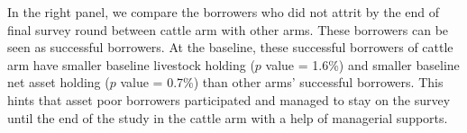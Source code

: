 	In the right panel, we compare the borrowers who did not attrit by the end of final survey round between \textsf{cattle} arm with other arms. These borrowers can be seen as successful borrowers. At the baseline, these successful borrowers of \textsf{cattle} arm have smaller baseline livestock holding ($p$ value = 1.6\%) and smaller baseline net asset holding ($p$ value = 0.7\%) than other arms' successful borrowers. %
	This hints that asset poor borrowers participated and managed to stay on the survey until the end of the study in the \textsf{cattle} arm with a help of managerial supports.
	
%

